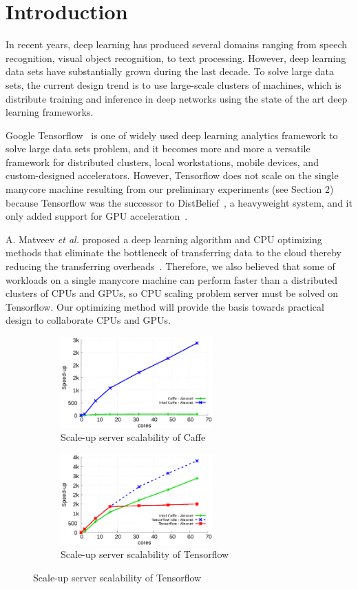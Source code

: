 \documentclass{IOS-Book-Article}
\begin{document}
\section{Introduction}
In recent years, deep learning has produced several domains ranging from speech
recognition, visual object recognition, to text processing.
However, deep learning data sets have substantially grown during the last
decade. 
To solve large data sets, the current design trend is to use large-scale
clusters of machines, which is distribute training and inference in deep
networks using the state of the art deep learning frameworks.

Google Tensorflow~\cite{Abadi2016TSL} is one of widely used deep learning
analytics framework to solve large data sets problem, and it becomes more and
more a versatile framework for distributed clusters, local workstations, mobile
devices, and custom-designed accelerators.
However, Tensorflow does not scale on the single manycore machine resulting
from our preliminary experiments (see Section 2) because Tensorflow was the
successor to DistBelief~\cite{Dean2012LSD}, a heavyweight system, and it only
added support for GPU acceleration~\cite{Abadi2016TSL}.

A. Matveev \textit{et al.} proposed a deep learning algorithm and CPU
optimizing methods that eliminate the bottleneck of transferring data to the
cloud thereby reducing the transferring overheads~\cite{Matveev2017MPC}.
Therefore, we also believed that some of workloads on a single manycore machine
can perform faster than a distributed clusters of CPUs and GPUs, so CPU scaling
problem server must be solved on Tensorflow.
Our optimizing method will provide the basis towards practical design to
collaborate CPUs and GPUs.

\begin{figure}[tb]
    \centering
    \begin{subfigure}[b]{0.5\textwidth}
        \includegraphics[width=2.3in]{graph/caffe.eps}
        \caption{Scale-up server scalability of Caffe}
    \end{subfigure}%
    \begin{subfigure}[b]{0.5\textwidth}
        \includegraphics[width=2.3in]{graph/tensorflow.eps}
        \caption{Scale-up server scalability of Tensorflow}
    \end{subfigure}%
    \label{fig:scalability}
\end{figure}
\end{document}
